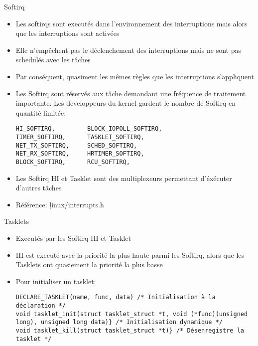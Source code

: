 \begin{frame}[fragile=singleslide]{Softirq}
  \begin{itemize} 
  \item   Les  softirqs   sont  executés   dans   l'environnement  des
    interruptions mais alors que les interruptions sont activées
  \item Elle  n'empêchent pas le déclenchement  des interruptions mais
    ne sont pas schedulés avec les tâches
  \item   Par  conséquent,   quasiment  les   mêmes  règles   que  les
    interruptions s'appliquent
  \item Les Softirq sont réservés aux tâche demandant une fréquence de
    traitement  importante.  Les  developpeurs  du kernel  gardent  le
    nombre de Softirq en quantité limitée:
    \begin{lstlisting} 
HI_SOFTIRQ,         BLOCK_IOPOLL_SOFTIRQ,
TIMER_SOFTIRQ,      TASKLET_SOFTIRQ,
NET_TX_SOFTIRQ,     SCHED_SOFTIRQ,
NET_RX_SOFTIRQ,     HRTIMER_SOFTIRQ,
BLOCK_SOFTIRQ,      RCU_SOFTIRQ,
    \end{lstlisting} 
  \item Les Softirq HI et Tasklet sont des multiplexeurs permettant
    d'éxécuter d'autres tâches
  \item Référence: \c{linux/interrupts.h}
  \end{itemize} 
\end{frame}

\begin{frame}[fragile=singleslide]{Tasklets}
  \begin{itemize} 
  \item Executés par les Softirq HI et Tasklet
  \item  HI est  executé  avec la  priorité  la plus  haute parmi  les
    Softirq, alors que les Tasklets ont quasiement la priorité la plus
    basse
  \item Pour initialiser un tasklet:
    \begin{lstlisting} 
DECLARE_TASKLET(name, func, data) /* Initialisation à la déclaration */
void tasklet_init(struct tasklet_struct *t, void (*func)(unsigned long), unsigned long data)} /* Initialisation dynamique */
void tasklet_kill(struct tasklet_struct *t)} /* Désenregistre la tasklet */
    \end{lstlisting} 
  \end{itemize}
\end{frame}


